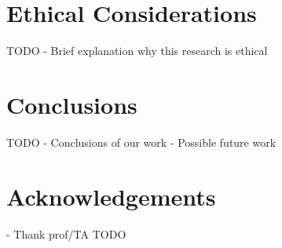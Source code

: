 \documentclass[letterpaper,twocolumn,10pt]{article}
\begin{document}
\section{Ethical Considerations}
TODO
- Brief explanation why this research is ethical

\section{Conclusions}
TODO
- Conclusions of our work
- Possible future work

\section*{Acknowledgements}
- Thank prof/TA
TODO~\cite{ipv4sta}

{\footnotesize 
}

\theendnotes
\end{document}

